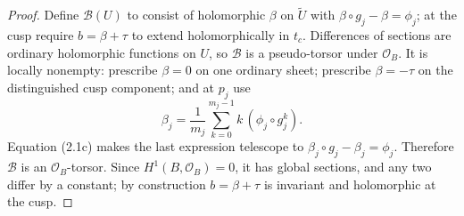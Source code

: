 \begin{proof}
Define \(\mathcal B(U)\) to consist of holomorphic \(\beta\) on
\(\widetilde U\) with
\(\beta\circ g_j-\beta=\phi_j\); at the cusp require
\(b=\beta+\tau\) to extend holomorphically in \(t_c\).  Differences of
sections are ordinary holomorphic functions on \(U\), so
\(\mathcal B\) is a pseudo-torsor under \(\mathcal O_B\).  It is locally
nonempty: prescribe \(\beta=0\) on one ordinary sheet; prescribe
\(\beta=-\tau\) on the distinguished cusp component; and at \(p_j\) use
\[
 \beta_j=\frac1{m_j}\sum_{k=0}^{m_j-1}
 k\,(\phi_j\circ g_j^k).
 \tag{2.1d}
\]
Equation (2.1c) makes the last expression telescope to
\(\beta_j\circ g_j-\beta_j=\phi_j\).  Therefore \(\mathcal B\) is an
\(\mathcal O_B\)-torsor.  Since \(H^1(B,\mathcal O_B)=0\), it has global
sections, and any two differ by a constant; by construction
\(b=\beta+\tau\) is invariant and holomorphic at the cusp.


\end{proof}
